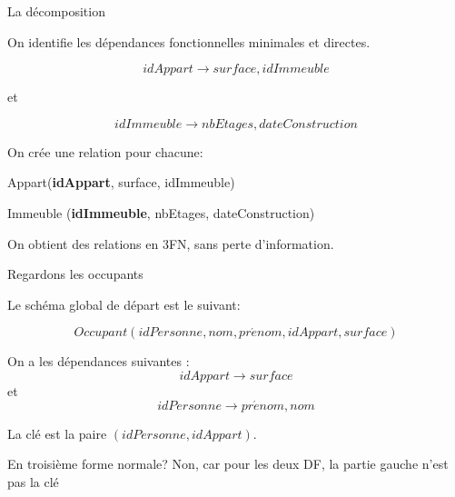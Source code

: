 \begin{frame}{La décomposition}


On identifie les dépendances fonctionnelles \alert{minimales} et \alert{directes}.

$$idAppart \to  surface, idImmeuble$$

et

$$idImmeuble \to nbEtages, dateConstruction$$

\vfill

On crée une relation pour chacune:

\begin{redbullet}
  \item Appart(\textbf{idAppart}, surface, idImmeuble)
  \item Immeuble (\textbf{idImmeuble}, nbEtages, dateConstruction)
\end{redbullet}


\begin{blocgauche}
On obtient des relations en 3FN, \alert{sans perte d'information}.
\end{blocgauche}
\end{frame}

\begin{frame}{Regardons les occupants}

Le schéma global de départ est le suivant:


$$Occupant(idPersonne, nom, pr\acute{e}nom, idAppart, surface)$$

\vfill

On a les dépendances suivantes :
$$idAppart \to surface$$
et
$$idPersonne \to pr\acute{e}nom, nom$$

\vfill

La clé est la paire $(idPersonne, idAppart)$. 

\vfill
\begin{blocgauche}
\begin{remblock}{En troisième forme normale?}
Non, car pour les \alert{deux} DF,  la partie gauche n'est pas la clé
\end{remblock}
\end{blocgauche}
\end{frame}

